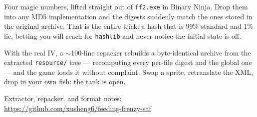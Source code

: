 \documentclass[10pt]{article}
\begin{document}
Four magic numbers, lifted straight out of \texttt{ff2.exe} in Binary Ninja.
Drop them into any MD5 implementation and the digests suddenly match the ones
stored in the original archive. That is the entire trick: a hash that is 99\%
standard and 1\% lie, betting you will reach for \texttt{hashlib} and never
notice the initial state is off.

With the real IV, a $\sim$100-line repacker rebuilds a byte-identical archive
from the extracted \texttt{resource/} tree --- recomputing every per-file digest
and the global one --- and the game loads it without complaint. Swap a sprite,
retranslate the XML, drop in your own fish: the tank is open.

\vspace{0.6em}
{\small Extractor, repacker, and format notes:\\
\url{https://github.com/xusheng6/feeding-frenzy-saf}}
\end{document}

